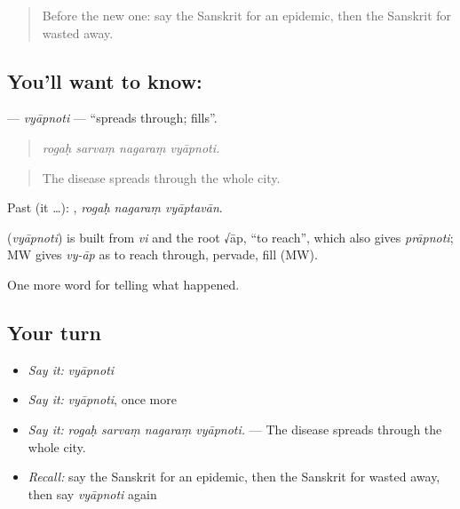 \label{lesson:SA-C303-vyapnoti}



\begin{quote}
Before the new one: say the Sanskrit for an epidemic, then the Sanskrit for wasted away.
\end{quote}

\subsection*{You'll want to know: }
\textbf{} — \emph{vyāpnoti} — \textquotedblleft{}spreads through; fills\textquotedblright{}.

\begin{quote}
   
\end{quote}

\begin{quote}
\emph{rogaḥ sarvaṃ nagaraṃ vyāpnoti.}
\end{quote}

\begin{quote}
The disease spreads through the whole city.
\end{quote}

Past (it …):   , \emph{rogaḥ nagaraṃ vyāptavān}.

\begin{cousinweb}
\textbf{} (\emph{vyāpnoti}) is built from \emph{vi} and the root √āp, \textquotedblleft{}to reach\textquotedblright{}, which also gives \emph{prāpnoti}; MW gives \emph{vy-āp} as to reach through, pervade, fill (MW).
\end{cousinweb}

\begin{grammarlens}[title={What you've built}]
One more word for telling what happened.
\end{grammarlens}

\subsection*{Your turn}
\begin{itemize}
\raggedright
  \item \emph{Say it:} \emph{vyāpnoti}
  \item \emph{Say it:} \emph{vyāpnoti}, once more
  \item \emph{Say it:} \emph{rogaḥ sarvaṃ nagaraṃ vyāpnoti.} — The disease spreads through the whole city.
  \item \emph{Recall:} say the Sanskrit for an epidemic, then the Sanskrit for wasted away, then say \emph{vyāpnoti} again
\end{itemize}

